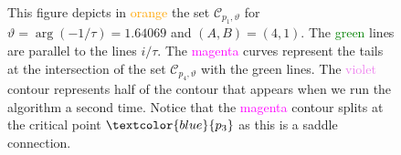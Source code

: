 \documentclass[12pt,reqno]{amsart}
\theoremstyle{definition}
\def\calC{\mathcal C}
\renewcommand{\=}{\;=\;}
\begin{document}
\begin{figure}[ht]
\begin{tiny}
\end{tiny}
\caption{This figure depicts in \textcolor{orange}{orange} the set $\calC_{p_1,\vartheta}$ for $\vartheta=\arg(-1/\tau)=1.64069$ and $(A,B)=(4,1)$. The \textcolor{green}{green} lines are parallel to the lines $i/\tau$. The \textcolor{magenta}{magenta} curves represent the tails at the intersection of the set $\calC_{p_4,\vartheta}$ with the green lines. The \textcolor{violet}{violet} contour represents half of the contour that appears when we run the algorithm a second time. Notice that the \textcolor{magenta}{magenta} contour splits at the critical point $\textcolor{blue}{p_3}$ as this is a saddle connection.}
\label{fig:saddle.A4B1.II-III}
\end{figure}
\end{document}
